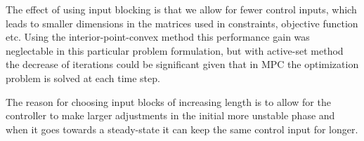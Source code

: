 \documentclass[11pt, a4paper, english]{NTNUoving}
\begin{document}
\begin{oppgave}
    \begin{punkt}
        The effect of using input blocking is that we allow for fewer control inputs, which leads to smaller
        dimensions in the matrices used in constraints, objective function etc. Using the
        interior-point-convex method this performance gain was neglectable in this particular
        problem formulation, but with active-set method the decrease of iterations could be significant
        given that in MPC the optimization problem is solved at each time step.

        The reason for choosing input blocks of increasing length is to allow for the controller to make larger adjustments in the initial more
        unstable phase and when it goes towards a steady-state it can keep the same control input for longer.

    \end{punkt}


\end{oppgave}
\end{document}
